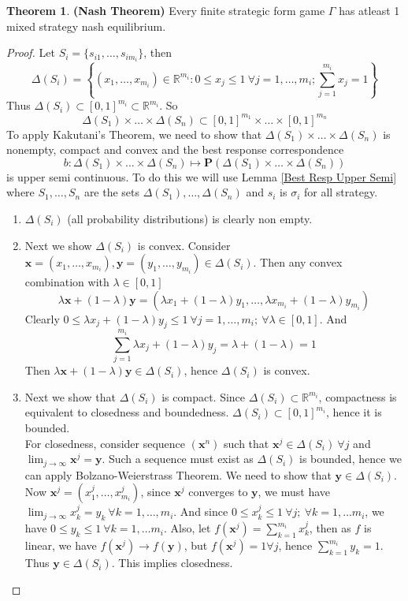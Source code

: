 \documentclass{article}
\theoremstyle{definition}
\newtheorem{theorem}{Theorem}[section]
\begin{document}
\begin{theorem}
\textbf{(Nash Theorem)} Every finite strategic form game $\Gamma$ has atleast 1 mixed strategy nash equilibrium.
\end{theorem}
\begin{proof}
Let $S_i = \{s_{i1},\dots, s_{i{m_i}}\}$, then $$\Delta(S_i) = \left\{(x_1,\dots,x_{m_i})\in \mathbb{R}^{m_i} : 0\leq x_j\leq 1~\forall j=1,\dots,m_i; \sum_{j=1}^{m_i}x_j = 1\right\}$$  Thus $\Delta(S_i)\subset [0,1]^{m_i} \subset \mathbb{R}^{m_i}$. So $$\Delta(S_1)\times\dots\times \Delta(S_n) \subset [0,1]^{m_1}\times\dots\times[0,1]^{m_n}$$ 
To apply Kakutani's Theorem, we need to show that $\Delta(S_1)\times\dots\times \Delta(S_n)$ is nonempty, compact and convex and the best response correspondence $$b:\Delta(S_1)\times\dots\times \Delta(S_n) \mapsto \mathbf{P}(\Delta(S_1)\times\dots\times \Delta(S_n))$$ is upper semi continuous. To do this we will use Lemma \ref{Best Resp Upper Semi} where $S_1,\dots,S_n$ are the sets $\Delta(S_1),\dots,\Delta(S_n)$ and $s_i$ is $\sigma_i$ for all strategy.
\begin{enumerate}
	\item $\Delta(S_i)$ (all probability distributions) is clearly non empty.
	\item Next we show $\Delta(S_i)$ is convex. Consider $\mathbf{x} = (x_1,\dots,x_{m_i}),\mathbf{y}=(y_1,\dots,y_{m_i}) \in \Delta(S_i)$. Then any convex combination with $\lambda\in [0,1]$ $$\lambda \mathbf{x} + (1-\lambda)\mathbf{y} = (\lambda x_1 + (1-\lambda)y_1, \dots, \lambda x_{m_i} + (1-\lambda)y_{m_i})$$
	Clearly $0\leq \lambda x_j + (1-\lambda)y_j\leq 1~\forall j = 1,\dots,m_i;~\forall \lambda\in[0,1]$. And $$\sum_{j=1}^{m_i} \lambda x_j + (1-\lambda)y_j = \lambda + (1-\lambda) = 1$$ Then $\lambda\mathbf{x} + (1-\lambda)\mathbf{y} \in \Delta(S_i)$, hence $\Delta(S_i)$ is convex.
	\item Next we show that $\Delta(S_i)$ is compact. Since $\Delta(S_i)\subset \mathbb{R}^{m_i}$, compactness is equivalent to closedness and boundedness. $\Delta(S_i)\subset [0,1]^{m_i}$, hence it is bounded.\\
	For closedness, consider sequence $(\mathbf{x}^n)$ such that $\mathbf{x}^j \in \Delta(S_i)~\forall j$ and $\lim_{j\to\infty} \mathbf{x}^j = \mathbf{y}$. Such a sequence must exist as $\Delta(S_i)$ is bounded, hence we can apply Bolzano-Weierstrass Theorem. We need to show that $\mathbf{y}\in \Delta(S_i)$.\\
	Now $\mathbf{x}^j = (x^j_1,\dots,x^j_{m_i})$, since $\mathbf{x}^j$ converges to $\mathbf{y}$, we must have $\lim_{j\to\infty} x^j_k = y_k~\forall k = 1,\dots,m_i$. And since $0\leq x^j_k\leq 1~\forall j;~\forall k = 1,\dots m_i$, we have $0\leq y_k\leq 1~\forall k = 1,\dots m_i$. Also, let $f(\mathbf{x}^j) = \sum_{k=1}^{m_i} x^j_k$, then as $f$ is linear, we have $f(\mathbf{x}^j) \to f(\mathbf{y})$, but $f(\mathbf{x}^j) =1 \forall j$, hence $\sum_{k=1}^{m_i} y_k = 1$. Thus $\mathbf{y}\in \Delta(S_i)$. This implies closedness.

\end{enumerate}
\end{proof}
\end{document}
